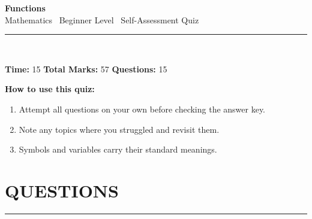 \documentclass[12pt,a4paper]{article}
\begin{document}
\begin{center}
{\LARGE\bfseries Functions}\\[6pt]
{\large Mathematics \textbar\ Beginner Level \textbar\ Self-Assessment Quiz}\\[4pt]
\end{center}
\noindent\rule{\linewidth}{0.6pt}\\[6pt]
\begin{center}
\textbf{Time:} 15 \qquad \textbf{Total Marks:} 57 \qquad \textbf{Questions:} 15
\end{center}
\vspace{6pt}
\noindent\textbf{How to use this quiz:}
\begin{enumerate}[leftmargin=2em, topsep=2pt, itemsep=0pt, parsep=0pt]
  \item Attempt all questions on your own before checking the answer key.
  \item Note any topics where you struggled and revisit them.
  \item Symbols and variables carry their standard meanings.
\end{enumerate}
\vspace{10pt}
\section*{QUESTIONS}
\noindent\rule{\linewidth}{0.4pt}
\vspace{4pt}
\end{document}
